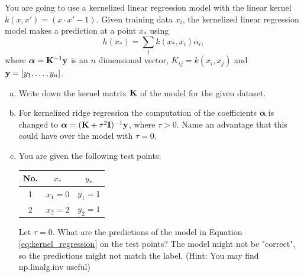 \documentclass[11pt]{article}
\begin{document}
You are going to use a kernelized linear regression model
with the linear kernel $k(x, x') = (x \cdot x'-1)$.
Given training data $x_i$, the kernelized linear regression model makes a prediction at a point $x_*$ using 
\begin{equation}
\label{eq:kernel_regression}
h(x_*) = \sum_i k(x_*, x_i) \alpha_i,
\end{equation}
where $\boldsymbol \alpha = \bold K^{-1} \bold y$ is an $n$ dimensional vector,  
$K_{ij} = k(x_i, x_j)$ and $\bold y = [y_1, \hdots, y_n]$.

\begin{enumerate}[(a)]
 	 \item Write down the kernel matrix $\bold K$ of the model for the given dataset. 
   	\item For kernelized ridge regression the computation of the coefficients $\boldsymbol \alpha$ is changed to $\boldsymbol \alpha = (\bold K + \tau^2 \bold I)^{-1} \bold y$, where $\tau > 0$.
Name an advantage that this could have over the model with $\tau = 0$.

	\item You are given the following test points:
	\begin{table}[h]
		\centering
		\begin{tabular}{|c|c|c|}
			\hline
			No.& $x_*$ & $y_*$ \\
			\hline
			1 & $x_1=0$ & $y_1=1$ \\
            \hline
			2 & $x_2=2$ & $y_2=1$ \\
			\hline
		\end{tabular}
	\end{table}
	\newline
	Let $\tau = 0$. What are the predictions of the model in Equation \eqref{eq:kernel_regression} on the test points? The model might not be "correct", so the predictions might not match the label. (Hint: You may find np.linalg.inv useful)
\end{enumerate}
\end{document}
